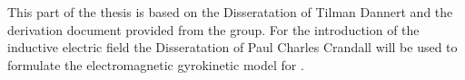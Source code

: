 \bigskip
This part of the thesis is based on the Disseratation of Tilman Dannert\cite{Dannert_PHD} and the derivation document provided from the \gkw group\cite{GKWDerivation}. For the introduction of the inductive electric field the Disseratation of Paul Charles Crandall\cite{Crandall_PHD} will be used to formulate the electromagnetic gyrokinetic model for \gkw.

\newpage

